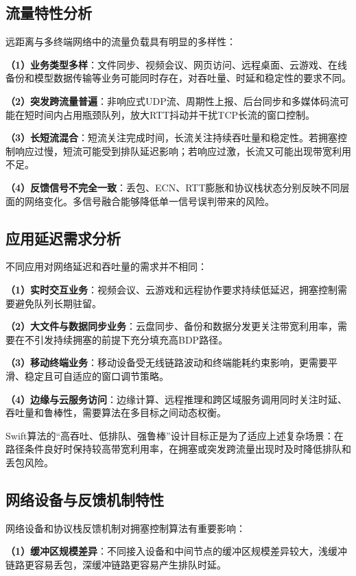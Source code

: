 \subsection{流量特性分析}

远距离与多终端网络中的流量负载具有明显的多样性：

\textbf{（1）业务类型多样}：文件同步、视频会议、网页访问、远程桌面、云游戏、在线备份和模型数据传输等业务可能同时存在，对吞吐量、时延和稳定性的要求不同。

\textbf{（2）突发跨流量普遍}：非响应式UDP流、周期性上报、后台同步和多媒体码流可能在短时间内占用瓶颈队列，放大RTT抖动并干扰TCP长流的窗口控制。

\textbf{（3）长短流混合}：短流关注完成时间，长流关注持续吞吐量和稳定性。若拥塞控制响应过慢，短流可能受到排队延迟影响；若响应过激，长流又可能出现带宽利用不足。

\textbf{（4）反馈信号不完全一致}：丢包、ECN、RTT膨胀和协议栈状态分别反映不同层面的网络变化。多信号融合能够降低单一信号误判带来的风险。

\subsection{应用延迟需求分析}

不同应用对网络延迟和吞吐量的需求并不相同：

\textbf{（1）实时交互业务}：视频会议、云游戏和远程协作要求持续低延迟，拥塞控制需要避免队列长期驻留。

\textbf{（2）大文件与数据同步业务}：云盘同步、备份和数据分发更关注带宽利用率，需要在不引发持续拥塞的前提下充分填充高BDP路径。

\textbf{（3）移动终端业务}：移动设备受无线链路波动和终端能耗约束影响，更需要平滑、稳定且可自适应的窗口调节策略。

\textbf{（4）边缘与云服务访问}：边缘计算、远程推理和跨区域服务调用同时关注时延、吞吐量和鲁棒性，需要算法在多目标之间动态权衡。

Swift算法的“高吞吐、低排队、强鲁棒”设计目标正是为了适应上述复杂场景：在路径条件良好时保持较高带宽利用率，在拥塞或突发跨流量出现时及时降低排队和丢包风险。

\subsection{网络设备与反馈机制特性}

网络设备和协议栈反馈机制对拥塞控制算法有重要影响：

\textbf{（1）缓冲区规模差异}：不同接入设备和中间节点的缓冲区规模差异较大，浅缓冲链路更容易丢包，深缓冲链路更容易产生排队时延。

